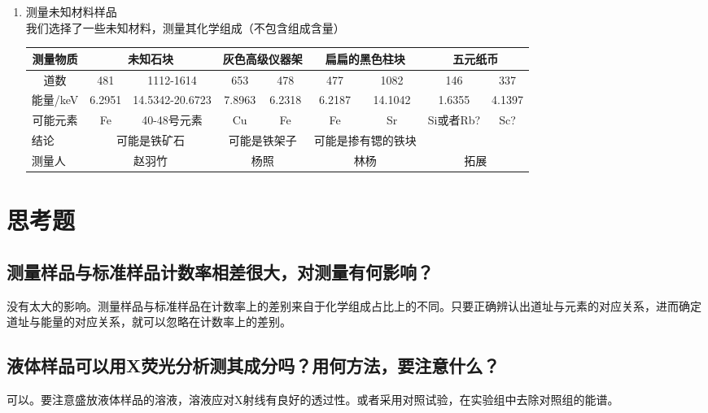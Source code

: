 \documentclass[a4paper]{article}
\begin{document}
\begin{enumerate}
\item 测量未知材料样品\\
我们选择了一些未知材料，测量其化学组成（不包含组成含量）
\begin{table}[]
	\begin{tabular}{|c|cc|cc|cc|cc|}
	\hline
	测量物质                     & \multicolumn{2}{c|}{未知石块}               & \multicolumn{2}{c|}{灰色高级仪器架}       & \multicolumn{2}{c|}{扁扁的黑色柱块}     & \multicolumn{2}{c|}{五元纸币}       \\ \hline
	道数                       & \multicolumn{1}{c|}{481} & 1112-1614 & \multicolumn{1}{c|}{653} & 478 & \multicolumn{1}{c|}{477} & 1082 & \multicolumn{1}{c|}{146} & 337                    \\ \hline
	能量/keV                       & \multicolumn{1}{c|}{6.2951}    & 14.5342-20.6723             & \multicolumn{1}{c|}{7.8963}    &  6.2318   & \multicolumn{1}{c|}{6.2187}    & 14.1042     & \multicolumn{1}{c|}{1.6355}    &  4.1397   \\ \hline
	可能元素                     & \multicolumn{1}{c|}{Fe}  & 40-48号元素     & \multicolumn{1}{c|}{Cu}    & Fe  & \multicolumn{1}{c|}{Fe}  & Sr  & \multicolumn{1}{c|}{Si或者Rb?}    & Sc?  \\ \hline
	\multicolumn{1}{|l|}{结论} & \multicolumn{2}{c|}{可能是铁矿石}          & \multicolumn{2}{c|}{可能是铁架子}          & \multicolumn{2}{c|}{可能是掺有锶的铁块}           & \multicolumn{2}{c|}{}          \\ \hline
	\multicolumn{1}{|l|}{测量人}   & \multicolumn{2}{c|}{赵羽竹}                & \multicolumn{2}{c|}{杨照}        & \multicolumn{2}{c|}{林杨}         & \multicolumn{2}{c|}{拓展}  \\ \hline
\end{tabular}
\end{table}
\end{enumerate}

\section{思考题}
\subsection{测量样品与标准样品计数率相差很大，对测量有何影响？}
没有太大的影响。测量样品与标准样品在计数率上的差别来自于化学组成占比上的不同。只要正确辨认出道址与元素的对应关系，进而确定道址与能量的对应关系，就可以忽略在计数率上的差别。
\subsection{液体样品可以用X荧光分析测其成分吗？用何方法，要注意什么？}
可以。要注意盛放液体样品的溶液，溶液应对X射线有良好的透过性。或者采用对照试验，在实验组中去除对照组的能谱。

\nocite{jiaocai}

\end{document}
